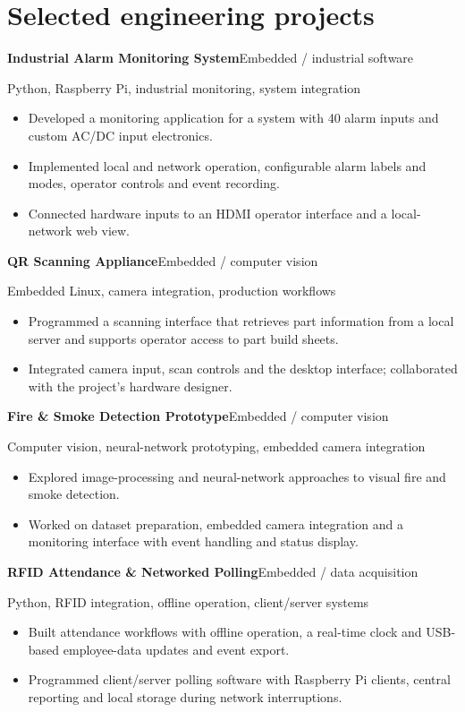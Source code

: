 \documentclass[11pt,a4paper]{article}
\newcommand{\entry}[2]{\textbf{#1}\hfill{\small\color{muted}#2}\par}
\newcommand{\tech}[1]{{\small\color{muted}#1}\par}
\begin{document}
\section*{Selected engineering projects}
\entry{Industrial Alarm Monitoring System}{Embedded / industrial software}
\tech{Python, Raspberry Pi, industrial monitoring, system integration}
\begin{itemize}
  \item Developed a monitoring application for a system with 40 alarm inputs and custom AC/DC input electronics.
  \item Implemented local and network operation, configurable alarm labels and modes, operator controls and event recording.
  \item Connected hardware inputs to an HDMI operator interface and a local-network web view.
\end{itemize}

\newpage
\entry{QR Scanning Appliance}{Embedded / computer vision}
\tech{Embedded Linux, camera integration, production workflows}
\begin{itemize}
  \item Programmed a scanning interface that retrieves part information from a local server and supports operator access to part build sheets.
  \item Integrated camera input, scan controls and the desktop interface; collaborated with the project's hardware designer.
\end{itemize}

\entry{Fire \& Smoke Detection Prototype}{Embedded / computer vision}
\tech{Computer vision, neural-network prototyping, embedded camera integration}
\begin{itemize}
  \item Explored image-processing and neural-network approaches to visual fire and smoke detection.
  \item Worked on dataset preparation, embedded camera integration and a monitoring interface with event handling and status display.
\end{itemize}

\entry{RFID Attendance \& Networked Polling}{Embedded / data acquisition}
\tech{Python, RFID integration, offline operation, client/server systems}
\begin{itemize}
  \item Built attendance workflows with offline operation, a real-time clock and USB-based employee-data updates and event export.
  \item Programmed client/server polling software with Raspberry Pi clients, central reporting and local storage during network interruptions.
\end{itemize}
\end{document}
